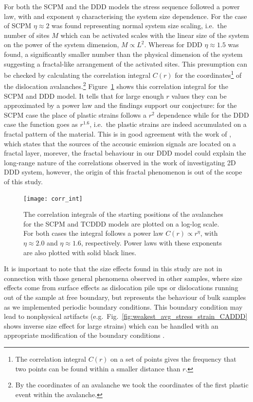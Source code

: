 For both the SCPM and the DDD models the stress sequence followed a power law, with and exponent $\eta$ characterising the system size dependence. For the case of SCPM $\eta \approx 2$ was found representing normal system size scaling, i.e.\ the number of sites $M$ which can be activated scales with the linear size of the system on the power of the system dimension, $M \propto L^2$. Whereas for DDD $\eta \approx 1.5$ was found, a significantly smaller number than the physical dimension of the system suggesting a fractal-like arrangement of the activated sites. This presumption can be checked by calculating the correlation integral $C\left( r \right)$ for the coordinates\footnote{The correlation integral $C\left( r \right)$ on a set of points gives the frequency that two points can be found within a smaller distance than $r$.} of the dislocation avalanches.\footnote{By the coordinates of an avalanche we took the coordinates of the first plastic event within the avalanche.} Figure~\ref{fig:corrlation_integral} shows this correlation integral for the SCPM and DDD model. It tells that for large enough $r$ values they can be approximated by a power law and the findings support our conjecture: for the SCPM case the place of plastic strains follows a $r^2$ dependence while for the DDD case the function goes as $r^{1.6}$, i.e.\ the plastic strains are indeed accumulated on a fractal pattern of the material. This is in good agreement with the work of \citet{weiss2003three}, which states that the sources of the accousic emission signals are located on a fractal layer, morever, the fractal behaviour in our DDD model could explain the long-range nature of the correlations observed in the work of \citet{PhysRevLett.112.235501} investigating 2D DDD system, however, the origin of this fractal phenomenon is out of the scope of this study.


\begin{figure}[htbp!] 
\centering    
\texttt{[image: corr\_int]}
\caption[Coreelation integral]{The correlation integrals of the starting positions of the avalanches for the SCPM and TCDDD models are plotted on a log-log scale. For both cases the integral follows a power law $C\left( r \right) \propto {r^\eta }$, with $\eta \approx 2.0$ and $\eta \approx 1.6$, respectively. Power laws with these exponents are also plotted with solid black lines.}
\label{fig:corrlation_integral}
\end{figure}

It is important to note that the size effects found in this study are not in connection with those general phenomena observed in other samples, where size effects come from surface effects as dislocation pile ups or dislocations running out of the sample at free boundary, but represents the behaviour of bulk samples as we implemented periodic boundary conditions. This boundary condition may lead to nonphysical artifacts (e.g.\ Fig.~\ref{fig:weakest_avg_stress_strain_CADDD} shows inverse size effect for large strains) which can be handled with an appropriate modification of the boundary conditions \cite{1742-5468-2015-8-P08009}.

